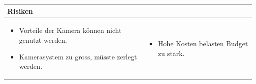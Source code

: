 \begin{table}[h]
\begin{tabular}{p{}p{}}


 \textbf{Risiken} & \\ \hline
	 
\begin{itemize}
\item Vorteile der Kamera können nicht genutzt werden.
\item Kamerasystem zu gross, müsste zerlegt werden.
\end{itemize}
&
\begin{itemize}
\item Hohe Kosten belasten Budget zu stark.
\end{itemize}

 
\end{tabular}
\end{table}

\pagebreak